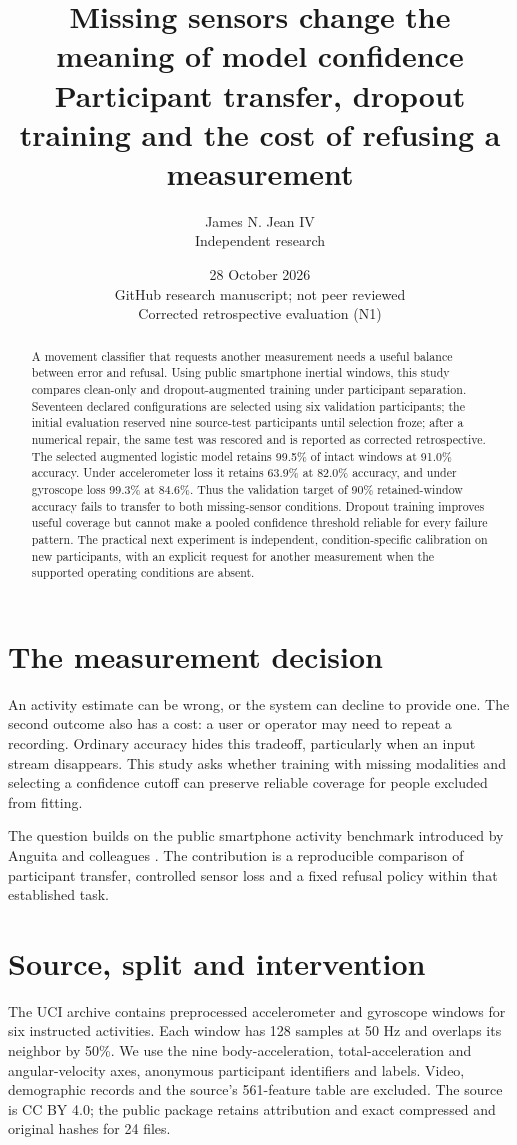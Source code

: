 \documentclass[11pt]{article}
\title{Missing sensors change the meaning of model confidence\\\large Participant transfer, dropout training and the cost of refusing a measurement}
\author{James N. Jean IV\\Independent research}
\date{28 October 2026\\GitHub research manuscript; not peer reviewed\\Corrected retrospective evaluation (N1)}
\begin{document}
\maketitle
\begin{abstract}
A movement classifier that requests another measurement needs a useful balance between error and refusal. Using public smartphone inertial windows, this study compares clean-only and dropout-augmented training under participant separation. Seventeen declared configurations are selected using six validation participants; the initial evaluation reserved nine source-test participants until selection froze; after a numerical repair, the same test was rescored and is reported as corrected retrospective. The selected augmented logistic model retains 99.5\% of intact windows at 91.0\% accuracy. Under accelerometer loss it retains 63.9\% at 82.0\% accuracy, and under gyroscope loss 99.3\% at 84.6\%. Thus the validation target of 90\% retained-window accuracy fails to transfer to both missing-sensor conditions. Dropout training improves useful coverage but cannot make a pooled confidence threshold reliable for every failure pattern. The practical next experiment is independent, condition-specific calibration on new participants, with an explicit request for another measurement when the supported operating conditions are absent.
\end{abstract}

\section{The measurement decision}
An activity estimate can be wrong, or the system can decline to provide one. The second outcome also has a cost: a user or operator may need to repeat a recording. Ordinary accuracy hides this tradeoff, particularly when an input stream disappears. This study asks whether training with missing modalities and selecting a confidence cutoff can preserve reliable coverage for people excluded from fitting.

The question builds on the public smartphone activity benchmark introduced by Anguita and colleagues \cite{data,paper}. The contribution is a reproducible comparison of participant transfer, controlled sensor loss and a fixed refusal policy within that established task.

\section{Source, split and intervention}
The UCI archive contains preprocessed accelerometer and gyroscope windows for six instructed activities. Each window has 128 samples at 50 Hz and overlaps its neighbor by 50\%. We use the nine body-acceleration, total-acceleration and angular-velocity axes, anonymous participant identifiers and labels. Video, demographic records and the source's 561-feature table are excluded. The source is CC BY 4.0; the public package retains attribution and exact compressed and original hashes for 24 files.
\end{document}
